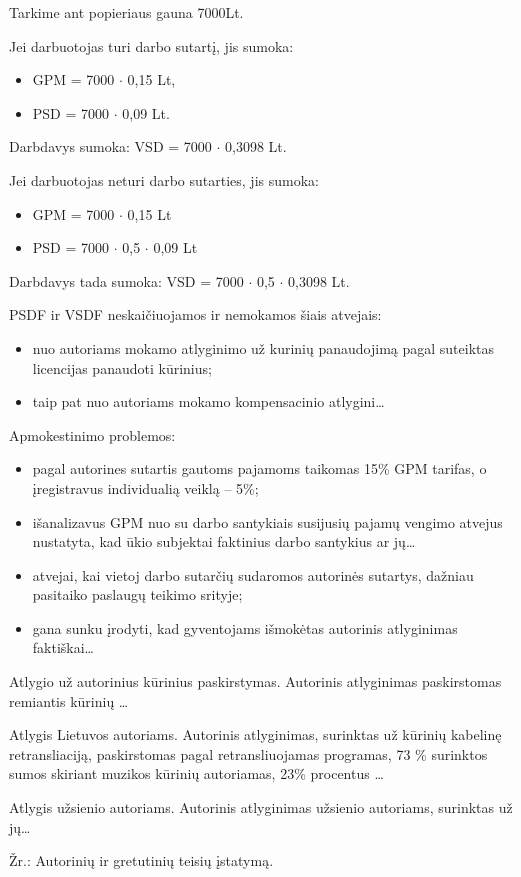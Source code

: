 \begin{exmp}
  Tarkime ant popieriaus gauna 7000Lt.

  Jei darbuotojas turi darbo sutartį, jis sumoka:
  \begin{itemize}
    \item GPM = 7000 $\cdot$ 0,15 Lt,
    \item PSD = 7000 $\cdot$ 0,09 Lt.
  \end{itemize}
  Darbdavys sumoka: VSD = 7000 $\cdot$ 0,3098 Lt.

  Jei darbuotojas neturi darbo sutarties, jis sumoka:
  \begin{itemize}
    \item GPM = 7000 $\cdot$ 0,15 Lt
    \item PSD = 7000 $\cdot$ 0,5 $\cdot$ 0,09 Lt
  \end{itemize}
  Darbdavys tada sumoka: VSD = 7000 $\cdot$ 0,5 $\cdot$ 0,3098 Lt.
\end{exmp}

PSDF ir VSDF  neskaičiuojamos ir nemokamos šiais atvejais:
\begin{itemize}
  \item nuo autoriams mokamo atlyginimo už kurinių panaudojimą
    pagal suteiktas licencijas panaudoti kūrinius;
  \item taip pat nuo autoriams mokamo kompensacinio atlygini…
\end{itemize}

Apmokestinimo problemos:
\begin{itemize}
  \item pagal autorines sutartis gautoms pajamoms taikomas 15\% GPM
    tarifas, o įregistravus individualią veiklą – 5\%;
  \item išanalizavus GPM nuo su darbo santykiais susijusių pajamų vengimo
    atvejus nustatyta, kad ūkio subjektai faktinius darbo santykius
    ar jų…
  \item atvejai, kai vietoj darbo sutarčių sudaromos autorinės sutartys,
    dažniau pasitaiko paslaugų teikimo srityje;
  \item gana sunku įrodyti, kad gyventojams išmokėtas autorinis atlyginimas
    faktiškai…
\end{itemize}

Atlygio už autorinius kūrinius paskirstymas. Autorinis atlyginimas
paskirstomas remiantis kūrinių …

Atlygis Lietuvos autoriams. Autorinis atlyginimas, surinktas už kūrinių
kabelinę retransliaciją, paskirstomas pagal retransliuojamas programas,
73 \% surinktos sumos skiriant muzikos kūrinių autoriamas, 23\% procentus
…

Atlygis užsienio autoriams. Autorinis atlyginimas užsienio autoriams,
surinktas už jų…

Žr.: Autorinių ir gretutinių teisių įstatymą.
